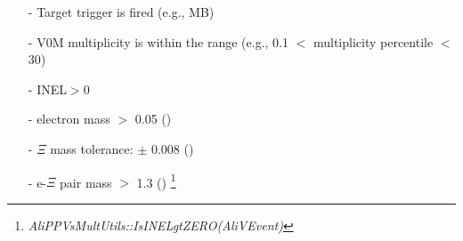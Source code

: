 \begin{itemize}
    \small
    \item []  \vspace{1pt}
    \item[-] Target trigger is fired (e.g., MB)
    \item[-] V0M multiplicity is within the range (e.g., 0.1 $<$ multiplicity percentile $<$ 30)
    \item[-] INEL$>$0
    \item[-] electron mass $>$ 0.05 (\GeVmass)
    \item[-] $\Xi$ mass tolerance: $\pm$ 0.008 (\GeVmass)
    \item[-] e-$\Xi$ pair mass $>$ 1.3 (\GeVmass)
    \footnote{\textit{AliPPVsMultUtils::IsINELgtZERO(AliVEvent)}}
\end{itemize}

